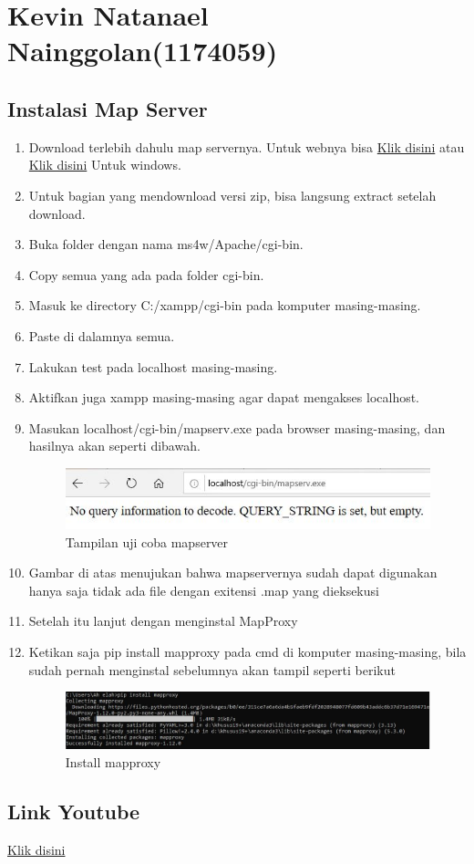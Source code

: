 \section{Kevin Natanael Nainggolan(1174059)}

\subsection{Instalasi Map Server}
\begin{enumerate}
    \item Download terlebih dahulu map servernya. Untuk webnya bisa \href{https://mapserver.org/}{Klik disini} atau \href{https://ms4w.com/}{Klik disini} Untuk windows.
	\item Untuk bagian yang mendownload versi zip, bisa langsung extract setelah download.
	\item Buka folder dengan nama ms4w/Apache/cgi-bin.
	\item Copy semua yang ada pada folder cgi-bin.
	\item Masuk ke directory C:/xampp/cgi-bin pada komputer masing-masing.
	\item Paste di dalamnya semua.
	\item Lakukan test pada localhost masing-masing.
	\item Aktifkan juga xampp masing-masing agar dapat mengakses localhost.
	\item Masukan localhost/cgi-bin/mapserv.exe pada browser masing-masing, dan hasilnya akan seperti dibawah.
	
	\hfill\break
    \begin{figure}[H]
		\includegraphics[width=12cm]{figures/1174059/tugas4/1.jpg}
		\centering
		\caption{Tampilan uji coba mapserver}
    \end{figure}
    \hfill\break
	
	\item Gambar di atas menujukan bahwa mapservernya sudah dapat digunakan hanya saja tidak ada file dengan exitensi .map yang dieksekusi
	\item Setelah itu lanjut dengan menginstal MapProxy
	\item Ketikan saja pip install mapproxy pada cmd di komputer masing-masing, bila sudah pernah menginstal sebelumnya akan tampil seperti berikut
	
	\hfill\break
    \begin{figure}[H]
		\includegraphics[width=12cm]{figures/1174059/tugas4/mapproxy.jpg}
		\centering
		\caption{Install mapproxy}
    \end{figure}
    \hfill\break
\end{enumerate}

\subsection{Link Youtube}
\href{https://youtu.be/y4RwhtPPur8}{Klik disini}